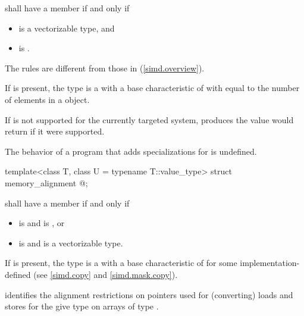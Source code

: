 \begin{wgText}
\begin{itemdescr}
\pnum
{} shall have a member  if and only if
\begin{itemize}
  \item {} is a vectorizable type, and
  \item {} is .
\end{itemize}
\begin{note}
  The rules are different from those in (\ref{simd.overview}).
\end{note}

\pnum
If  is present, the type  is a  with a base characteristic of  with  equal to the number of elements in a  object. \begin{note}If  is not supported for the currently targeted system,  produces the value  would return if it were supported.\end{note}

\pnum
The behavior of a program that adds specializations for  is undefined.
\end{itemdescr}

\begin{itemdecl}
template<class T, class U = typename T::value_type> struct memory_alignment { @\seebelow@ };
\end{itemdecl}

\begin{itemdescr}
\pnum
{} shall have a member  if and only if
\begin{itemize}
  \item {} is  and  is , or
  \item {} is  and  is a vectorizable type.
\end{itemize}

\pnum
If  is present, the type  is a  with a base characteristic of  for some implementation-defined  (see \ref{simd.copy} and \ref{simd.mask.copy}). \begin{note} identifies the alignment restrictions on pointers used for (converting) loads and stores for the give type  on arrays of type .\end{note}


\end{itemdescr}
\end{wgText}

